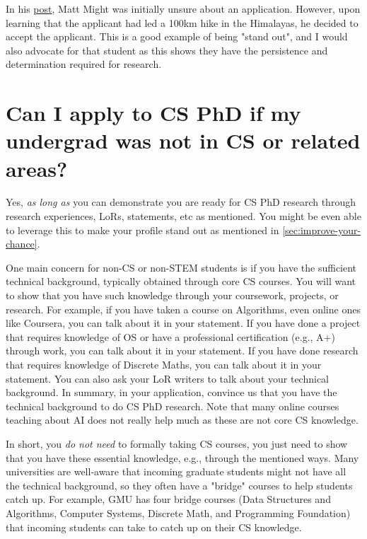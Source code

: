 \documentclass[oneside,11pt]{memoir}
\begin{document}
In his \href{https://matt.might.net/articles/how-to-apply-and-get-in-to-graduate-school-in-science-mathematics-engineering-or-computer-science/}{post}, Matt Might was initially unsure about an application. However, upon learning that the applicant had led a 100km hike in the Himalayas, he decided to accept the applicant.  This is a good example of being "stand out", and I would also advocate for that student as this shows they have the persistence and determination required for research.




\section{Can I apply to CS PhD if my undergrad was not in CS or related areas?}\label{sec:non-stem}

Yes, \emph{as long as} you can demonstrate you are ready for CS PhD research through research experiences, LoRs, statements, etc as mentioned. You might be even able to leverage this to make your profile stand out as mentioned in \autoref{sec:improve-your-chance}.

One main concern for non-CS or non-STEM students is if you have the sufficient technical background, typically obtained through core CS courses.  You will want to show that you have such knowledge through your coursework, projects, or research.
For example, if you have taken a course on Algorithms, even online ones like Coursera, you can talk about it in your statement.  If you have done a project that requires knowledge of OS or have a professional certification (e.g., A+) through work, you can talk about it in your statement.  If you have done research that requires knowledge of Discrete Maths, you can talk about it in your statement.  You can also ask your LoR writers to talk about your technical background.  
In summary, in your application, convince us that you have the technical background to do CS PhD research. 
Note that many online courses teaching about AI does not really help much as these are not core CS knowledge.

In short, you \emph{do not need} to formally taking CS courses, you just need to show that you have these essential knowledge, e.g., through the mentioned ways. Many universities are well-aware that incoming graduate students might not have all the technical background, so they often have a "bridge" courses to help students catch up.  For example, GMU has four bridge courses (Data Structures and Algorithms, Computer Systems, Discrete Math, and Programming Foundation) that incoming students can take to catch up on their CS knowledge.
\end{document}
